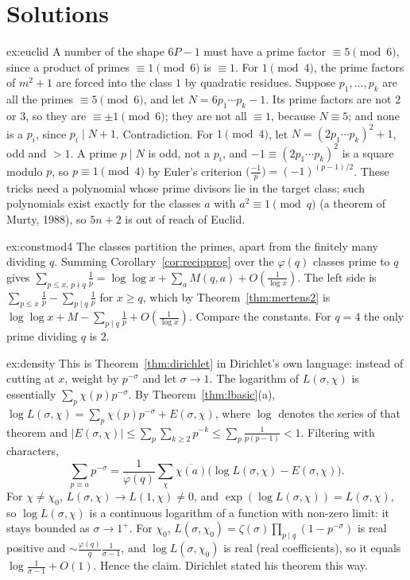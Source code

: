 \section{Solutions}

\begin{solution}{ex:euclid}
\idea A number of the shape $6P-1$ must have a prime factor $\equiv5\pmod6$, since a product of primes $\equiv1\pmod6$ is $\equiv1$. For $1\pmod4$, the
prime factors of $m^2+1$ are forced into the class $1$ by quadratic residues.
\writeup Suppose $p_1,\dots,p_k$ are all the primes $\equiv5\pmod6$, and let $N=6p_1\cdots p_k-1$. Its prime factors are not $2$ or $3$, so they are $\equiv\pm1\pmod6$;
they are not all $\equiv1$, because $N\equiv5$; and none is a $p_i$, since $p_i\mid N+1$. Contradiction. For $1\pmod4$, let $N=(2p_1\cdots p_k)^2+1$, odd and
$>1$. A prime $p\mid N$ is odd, not a $p_i$, and $-1\equiv(2p_1\cdots p_k)^2$ is a square modulo $p$, so $p\equiv1\pmod4$ by Euler's criterion $\bigl(\frac{-1}p\bigr)=(-1)^{(p-1)/2}$.
These tricks need a polynomial whose prime divisors lie in the target class; such polynomials exist exactly for the classes $a$ with $a^2\equiv1\pmod q$
(a theorem of Murty, 1988), so $5n+2$ is out of reach of Euclid.
\end{solution}

\begin{solution}{ex:constmod4}
\idea The classes partition the primes, apart from the finitely many dividing $q$.
\writeup Summing Corollary~\ref{cor:recipprog} over the $\varphi(q)$ classes prime to $q$ gives $\sum_{p\le x,\,p\nmid q}\frac1p=\log\log x+\sum_aM(q,a)+O(\frac1{\log x})$. The left side is
$\sum_{p\le x}\frac1p-\sum_{p\mid q}\frac1p$ for $x\ge q$, which by Theorem~\ref{thm:mertens2} is $\log\log x+M-\sum_{p\mid q}\frac1p+O(\frac1{\log x})$. Compare the constants. For $q=4$
the only prime dividing $q$ is $2$.
\end{solution}

\begin{solution}{ex:density}
\idea This is Theorem~\ref{thm:dirichlet} in Dirichlet's own language: instead of cutting at $x$, weight by $p^{-\sigma}$ and let $\sigma\to1$. The logarithm of $L(\sigma,\chi)$
is essentially $\sum_p\chi(p)p^{-\sigma}$.
\writeup By Theorem~\ref{thm:lbasic}(a), $\log L(\sigma,\chi)=\sum_p\chi(p)p^{-\sigma}+E(\sigma,\chi)$, where $\log$ denotes the series of that theorem and
$|E(\sigma,\chi)|\le\sum_p\sum_{k\ge2}p^{-k}\le\sum_p\frac1{p(p-1)}<1$. Filtering with characters,
\[
\sum_{p\equiv a}p^{-\sigma}=\frac1{\varphi(q)}\sum_\chi\overline{\chi(a)}\bigl(\log L(\sigma,\chi)-E(\sigma,\chi)\bigr).
\]
For $\chi\ne\chi_0$, $L(\sigma,\chi)\to L(1,\chi)\ne0$, and $\exp(\log L(\sigma,\chi))=L(\sigma,\chi)$, so $\log L(\sigma,\chi)$ is a continuous logarithm of a function with non-zero limit:
it stays bounded as $\sigma\to1^+$. For $\chi_0$, $L(\sigma,\chi_0)=\zeta(\sigma)\prod_{p\mid q}(1-p^{-\sigma})$ is real positive and $\sim\frac{\varphi(q)}q\frac1{\sigma-1}$, and $\log L(\sigma,\chi_0)$ is real
(real coefficients), so it equals $\log\frac1{\sigma-1}+O(1)$. Hence the claim. Dirichlet stated his theorem this way.
\end{solution}


